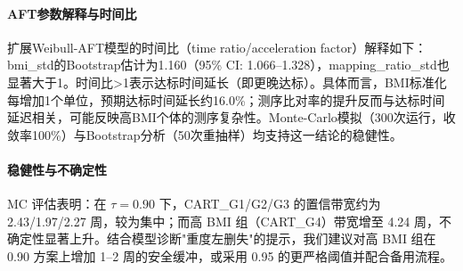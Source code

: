 \documentclass[withoutpreface]{cumcmthesis}
\begin{document}
\paragraph{AFT参数解释与时间比} 扩展Weibull-AFT模型的时间比（time ratio/acceleration factor）解释如下：bmi\_std的Bootstrap估计为1.160（95\% CI: 1.066–1.328），mapping\_ratio\_std也显著大于1。时间比>1表示达标时间延长（即更晚达标）。具体而言，BMI标准化每增加1个单位，预期达标时间延长约16.0\%；测序比对率的提升反而与达标时间延迟相关，可能反映高BMI个体的测序复杂性。Monte-Carlo模拟（300次运行，收敛率100\%）与Bootstrap分析（50次重抽样）均支持这一结论的稳健性。

\paragraph{稳健性与不确定性} MC 评估表明：在 $\tau=0.90$ 下，CART\_G1/G2/G3 的置信带宽约为 \num{2.43}/\num{1.97}/\num{2.27} 周，较为集中；而高 BMI 组（CART\_G4）带宽增至 \num{4.24} 周，不确定性显著上升。结合模型诊断"重度左删失"的提示，我们建议对高 BMI 组在 0.90 方案上增加 1–2 周的安全缓冲，或采用 0.95 的更严格阈值并配合备用流程。
\end{document}
